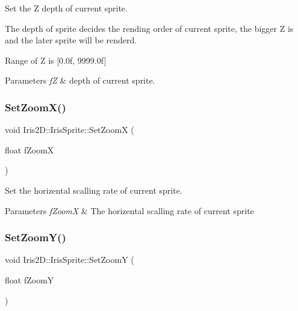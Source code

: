 Set the Z depth of current sprite. 

The depth of sprite decides the rending order of current sprite, the bigger Z is and the later sprite will be renderd.

Range of Z is \mbox{[}0.\+0f, 9999.\+0f\mbox{]} 
\begin{DoxyParams}{Parameters}
{\em fZ} & depth of current sprite. \\
\hline
\end{DoxyParams}
\mbox{\label{class_iris2_d_1_1_iris_sprite_a0c7c13b0d3ec355a09e3c9c2ccc9d91e}} 
\subsubsection{\texorpdfstring{Set\+Zoom\+X()}{SetZoomX()}}
{\footnotesize\ttfamily void Iris2\+D\+::\+Iris\+Sprite\+::\+Set\+ZoomX (\begin{DoxyParamCaption}\item[{float}]{f\+ZoomX }\end{DoxyParamCaption})}



Set the horizental scalling rate of current sprite. 


\begin{DoxyParams}{Parameters}
{\em f\+ZoomX} & The horizental scalling rate of current sprite \\
\hline
\end{DoxyParams}
\mbox{\label{class_iris2_d_1_1_iris_sprite_a316b2fbf2d0ecb1a1cd5b7bb95d62f05}} 
\subsubsection{\texorpdfstring{Set\+Zoom\+Y()}{SetZoomY()}}
{\footnotesize\ttfamily void Iris2\+D\+::\+Iris\+Sprite\+::\+Set\+ZoomY (\begin{DoxyParamCaption}\item[{float}]{f\+ZoomY }\end{DoxyParamCaption})}



